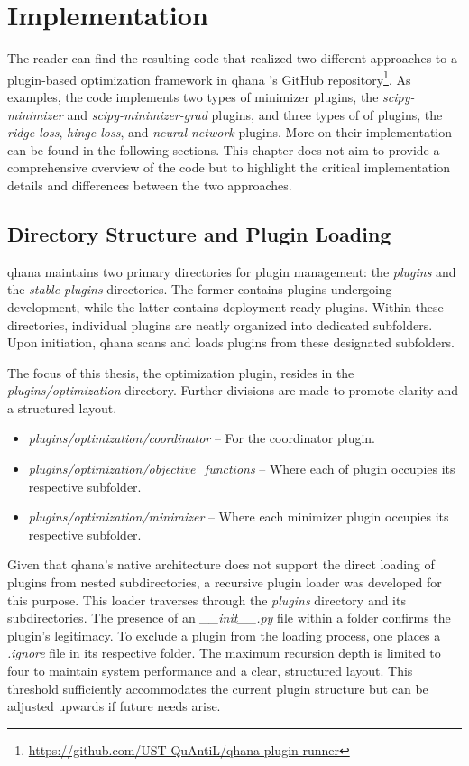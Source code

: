 \documentclass[
  a4paper,  %
  twoside,  %
  bibliography=totoc,
  headsepline,
  cleardoublepage=empty,
  parskip=half,
  draft=false
]{scrbook}
\begin{document}
\chapter{Implementation}
\label{chap:implementation}

The reader can find the resulting code that realized two different approaches to a plugin-based optimization framework in \gls{qhana} 's GitHub repository\footnote{\url{https://github.com/UST-QuAntiL/qhana-plugin-runner}}.
As examples, the code implements two types of minimizer plugins, the \emph{scipy-minimizer} and \emph{scipy-minimizer-grad} plugins, and three types of \gls{of} plugins, the \emph{ridge-loss}, \emph{hinge-loss}, and \emph{neural-network} plugins.
More on their implementation can be found in the following sections.
This chapter does not aim to provide a comprehensive overview of the code but to highlight the critical implementation details and differences between the two approaches.

\section{Directory Structure and Plugin Loading}
\label{sec:directoryStructure}

\gls{qhana} maintains two primary directories for plugin management: the \textit{plugins} and the \textit{stable plugins} directories.
The former contains plugins undergoing development, while the latter contains deployment-ready plugins.
Within these directories, individual plugins are neatly organized into dedicated subfolders.
Upon initiation, \gls{qhana} scans and loads plugins from these designated subfolders.

The focus of this thesis, the optimization plugin, resides in the \textit{plugins/optimization} directory.
Further divisions are made to promote clarity and a structured layout.

\begin{itemize}
  \item \textit{plugins/optimization/coordinator} – For the coordinator plugin.
  \item \textit{plugins/optimization/objective\_functions} – Where each \gls{of} plugin occupies its respective subfolder.
  \item \textit{plugins/optimization/minimizer} – Where each minimizer plugin occupies its respective subfolder.
\end{itemize}

Given that \gls{qhana}'s native architecture does not support the direct loading of plugins from nested subdirectories, a recursive plugin loader was developed for this purpose.
This loader traverses through the \textit{plugins} directory and its subdirectories.
The presence of an \textit{\_\_init\_\_.py} file within a folder confirms the plugin's legitimacy.
To exclude a plugin from the loading process, one places a \textit{.ignore} file in its respective folder.
The maximum recursion depth is limited to four to maintain system performance and a clear, structured layout.
This threshold sufficiently accommodates the current plugin structure but can be adjusted upwards if future needs arise.
\end{document}
